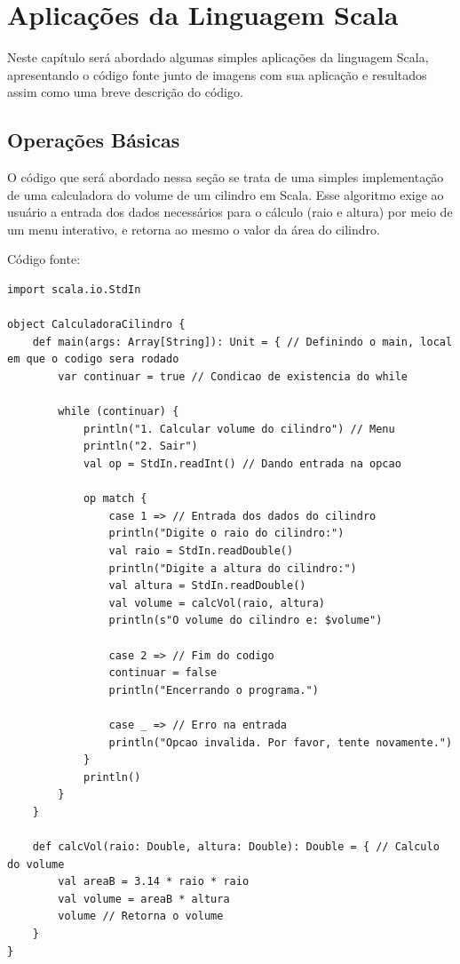 


\chapter{ Aplica\c{c}\~{o}es da Linguagem Scala}

Neste capítulo será abordado algumas simples aplicações da linguagem Scala, apresentando o código fonte junto de imagens com sua aplicação e resultados assim como uma breve descrição do código.



    \section{Operações Básicas}
    O código que será abordado nessa seção se trata de uma simples implementação de uma calculadora do volume de um cilindro em Scala. Esse algoritmo exige ao usuário a entrada dos dados necessários para o cálculo (raio e altura) por meio de um menu interativo, e retorna ao mesmo o valor da área do cilindro.
    
    Código fonte:
    \begin{lstlisting}[breaklines]
import scala.io.StdIn

object CalculadoraCilindro {
	def main(args: Array[String]): Unit = { // Definindo o main, local em que o codigo sera rodado
		var continuar = true // Condicao de existencia do while
		
		while (continuar) {
			println("1. Calcular volume do cilindro") // Menu
			println("2. Sair")
			val op = StdIn.readInt() // Dando entrada na opcao
			
			op match {
				case 1 => // Entrada dos dados do cilindro
				println("Digite o raio do cilindro:")
				val raio = StdIn.readDouble()
				println("Digite a altura do cilindro:")
				val altura = StdIn.readDouble()
				val volume = calcVol(raio, altura)
				println(s"O volume do cilindro e: $volume")
				
				case 2 => // Fim do codigo
				continuar = false
				println("Encerrando o programa.")
				
				case _ => // Erro na entrada
				println("Opcao invalida. Por favor, tente novamente.")
			}
			println()
		}
	}
	
	def calcVol(raio: Double, altura: Double): Double = { // Calculo do volume
		val areaB = 3.14 * raio * raio
		val volume = areaB * altura
		volume // Retorna o volume
	}
}
    \end{lstlisting}

